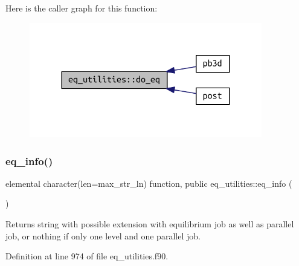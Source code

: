 Here is the caller graph for this function\+:
\nopagebreak
\begin{figure}[H]
\begin{center}
\leavevmode
\includegraphics[width=288pt]{namespaceeq__utilities_a5109472305101af3a15e8e8717c426fd_icgraph}
\end{center}
\end{figure}
\mbox{\label{namespaceeq__utilities_a34c5ddab45a54a6c738e5e0b8c7d55d6}} 
\subsubsection{\texorpdfstring{eq\+\_\+info()}{eq\_info()}}
{\footnotesize\ttfamily elemental character(len=max\+\_\+str\+\_\+ln) function, public eq\+\_\+utilities\+::eq\+\_\+info (\begin{DoxyParamCaption}{ }\end{DoxyParamCaption})}



Returns string with possible extension with equilibrium job as well as parallel job, or nothing if only one level and one parallel job. 



Definition at line 974 of file eq\+\_\+utilities.\+f90.

